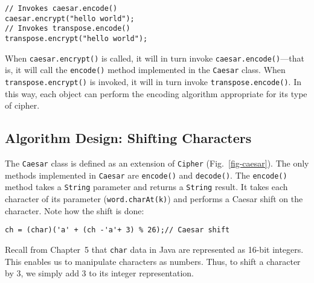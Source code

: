 \begin{jjjlisting}
\begin{lstlisting}
// Invokes caesar.encode()
caesar.encrypt("hello world");     
// Invokes transpose.encode()
transpose.encrypt("hello world");  
\end{lstlisting}
\end{jjjlisting}

\noindent When {\tt caesar.encrypt()} is called, it will in turn
invoke {\tt caesar.en\-code()}---that is, it will call the
{\tt encode()} method implemented in the {\tt Caesar} class.  When
{\tt transpose.encrypt()} is invoked, it will in turn invoke
{\tt trans\-pose.encode()}. In this way, each object can perform the encoding
algorithm appropriate for its type of 
cipher.

\subsection{Algorithm Design: Shifting Characters}
\noindent The {\tt Caesar} class is defined as an extension of {\tt Cipher}
(Fig.~\ref{fig-caesar}). The only methods implemented in {\tt Caesar}
are {\tt encode()} and {\tt decode()}. The {\tt encode()} method takes
a {\tt String} parameter and returns a {\tt String} result.  It takes
each character of its parameter ({\tt word.charAt(k)}) and performs a
Caesar shift on the character.  Note how the shift is done:

\begin{jjjlisting}
\begin{lstlisting}
ch = (char)('a' + (ch -'a'+ 3) % 26);// Caesar shift
\end{lstlisting}
\end{jjjlisting}

\noindent Recall from Chapter~5 that {\tt char} data in Java are
represented as 16-bit integers.  This enables us to manipulate
characters as numbers.  Thus, to shift a character by 3, we simply add
3 to its integer representation.

